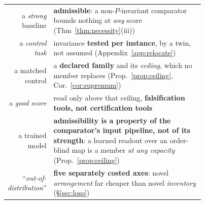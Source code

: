 {\footnotesize\setlength{\tabcolsep}{3pt}\renewcommand{\arraystretch}{0.95}
\begin{tabular}{@{}r@{\;$\Rightarrow$\;}p{0.77\linewidth}@{}}
a \emph{strong} baseline & \textbf{admissible}: a non-$P$-invariant comparator bounds nothing at \emph{any} score (Thm~\ref{thm:necessity}(iii)) \\
a \emph{control task} & invariance \textbf{tested per instance}, by a twin, not assumed (Appendix~\ref{app:relocate}) \\
a matched control & a \textbf{declared family} and its \emph{ceiling}, which no member replaces (Prop.~\ref{prop:ceiling}, Cor.~\ref{cor:supremum}) \\
a \emph{good score} & read only above that ceiling, \textbf{falsification tools, not certification tools} \\
a trained model & \textbf{admissibility is a property of the comparator's input pipeline, not of its strength}: a learned readout over an order-blind map is a member \emph{at any capacity} (Prop.~\ref{prop:ceiling}) \\
``\emph{out-of-distribution}'' & \textbf{five separately costed axes}: novel \emph{arrangement} far cheaper than novel \emph{inventory} (\S\ref{sec:loso}) \\
\end{tabular}}

